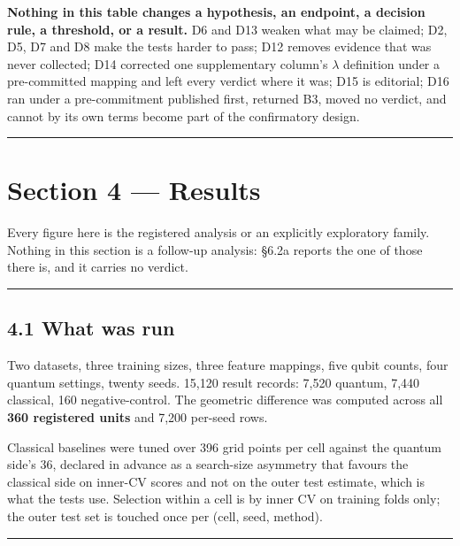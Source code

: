 \documentclass[
  10pt,
]{article}
\begin{document}
\textbf{Nothing in this table changes a hypothesis, an endpoint, a
decision rule, a threshold, or a result.} D6 and D13 weaken what may be
claimed; D2, D5, D7 and D8 make the tests harder to pass; D12 removes
evidence that was never collected; D14 corrected one supplementary
column's \(\lambda\) definition under a pre-committed mapping and left
every verdict where it was; D15 is editorial; D16 ran under a
pre-commitment published first, returned B3, moved no verdict, and
cannot by its own terms become part of the confirmatory design.

\begin{center}\rule{0.5\linewidth}{0.5pt}\end{center}

\section{Section 4 --- Results}\label{section-4-results}

Every figure here is the registered analysis or an explicitly
exploratory family. Nothing in this section is a follow-up analysis:
\S{}6.2a reports the one of those there is, and it carries no verdict.

\begin{center}\rule{0.5\linewidth}{0.5pt}\end{center}

\subsection{4.1 What was run}\label{what-was-run}

Two datasets, three training sizes, three feature mappings, five qubit
counts, four quantum settings, twenty seeds. 15,120 result records:
7,520 quantum, 7,440 classical, 160 negative-control. The geometric
difference was computed across all \textbf{360 registered units} and
7,200 per-seed rows.

Classical baselines were tuned over 396 grid points per cell against the
quantum side's 36, declared in advance as a search-size asymmetry that
favours the classical side on inner-CV scores and not on the outer test
estimate, which is what the tests use. Selection within a cell is by
inner CV on training folds only; the outer test set is touched once per
(cell, seed, method).

\begin{center}\rule{0.5\linewidth}{0.5pt}\end{center}
\end{document}
